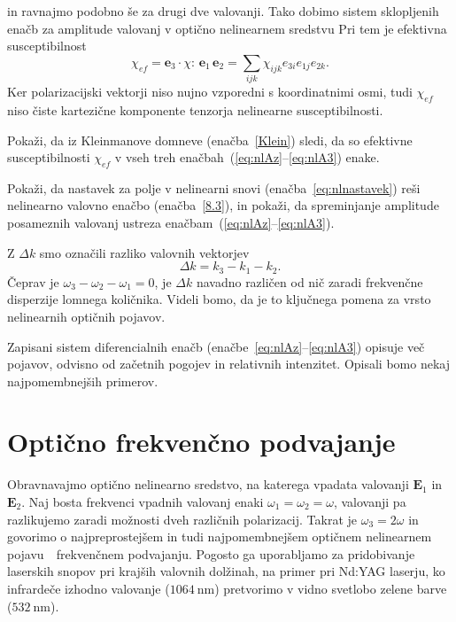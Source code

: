 in ravnajmo podobno še za drugi dve valovanji. Tako dobimo sistem sklopljenih
enačb za amplitude valovanj v optično nelinearnem sredstvu
Pri tem je efektivna susceptibilnost
\begin{equation}
\chi_{ef}=\mathbf{e}_{3}\cdot\chi:\,\mathbf{e}_{1}\,\mathbf{e}_{2} = 
\sum_{ijk} \chi_{ijk} e_{3i} e_{1j} e_{2k}.
\label{eq:chicomp}
\end{equation}
Ker polarizacijski vektorji niso nujno vzporedni s koordinatnimi osmi, tudi $\chi_{ef}$ 
niso čiste kartezične komponente tenzorja nelinearne susceptibilnosti.
\begin{definition}
Pokaži, da iz Kleinmanove domneve (enačba~\ref{Klein}) sledi, da so 
efektivne susceptibilnosti $\chi_{ef}$ v vseh treh enačbah~(\ref{eq:nlAz}--\ref{eq:nlA3}) enake.
\end{definition}
\begin{definition}
Pokaži, da nastavek za polje v nelinearni snovi (enačba~\ref{eq:nlnastavek}) reši nelinearno
valovno enačbo (enačba~\ref{8.3}), in pokaži, da spreminjanje amplitude posameznih valovanj 
ustreza enačbam~(\ref{eq:nlAz}--\ref{eq:nlA3}).
\end{definition}
Z $\Delta k$ smo označili razliko valovnih vektorjev
\begin{equation}
\Delta k = k_{3}-k_{1}-k_{2}.
\end{equation}
Čeprav je $\omega_{3}-\omega_{2}-\omega_{1}=0$, je $\Delta k$ navadno različen od nič zaradi 
frekvenčne disperzije lomnega količnika. Videli bomo, da je to ključnega pomena 
za vrsto nelinearnih optičnih pojavov. 

Zapisani sistem diferencialnih enačb (enačbe~\ref{eq:nlAz}--\ref{eq:nlA3}) opisuje več pojavov, 
odvisno od začetnih pogojev in relativnih intenzitet. Opisali bomo nekaj
najpomembnejših primerov.


\section{Optično frekvenčno podvajanje}

Obravnavajmo optično nelinearno sredstvo, na katerega vpadata valovanji ${\mathbf E}_1$ in
$\mathbf{E}_2$.
Naj bosta frekvenci vpadnih valovanj enaki $\omega_{1}=\omega_{2}=\omega$, valovanji
pa razlikujemo zaradi možnosti dveh različnih polarizacij. Takrat je $\omega_{3}=2\omega$
in govorimo o najpreprostejšem in tudi najpomembnejšem optičnem nelinearnem 
pojavu~\textendash~frekvenčnem podvajanju. 
Pogosto ga uporabljamo za pridobivanje laserskih snopov pri krajših valovnih dolžinah, na primer
pri Nd:YAG laserju, ko infrardeče izhodno valovanje ($1064~\si{\nano\metre}$) 
pretvorimo v vidno svetlobo zelene barve ($532~\si{\nano\metre}$). 

